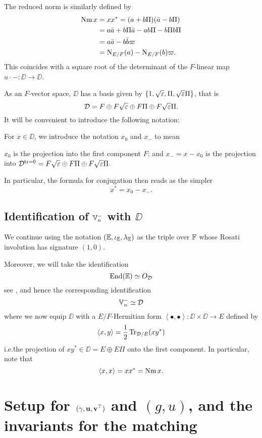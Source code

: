 The reduced norm is similarly defined by
\begin{align*}
  \operatorname{Nm} x &= x x^\ast = (a + b \Pi)(\bar a - b \Pi) \\
  &= a \bar a + b \Pi \bar a - a b \Pi - b \Pi b \Pi \\
  &= a \bar a - b \bar b \varpi \\
  &= \operatorname{N}_{E/F}(a) - \operatorname{N}_{E/F}(b) \varpi .
\end{align*}
This coincides with a square root of
the determinant of the $F$-linear map $u \cdot - \colon \DD \to \DD$.

As an $F$-vector space, $\DD$ has a basis given by
$\{1, \sqrt{\varepsilon}, \Pi, \sqrt{\varepsilon}\Pi\}$, that is
\[ \mathcal D = F \oplus F\sqrt{\varepsilon} \oplus F \Pi \oplus F\sqrt{\varepsilon}\Pi. \]
It will be convenient to introduce the following notation:
\begin{definition}
  For $x \in \DD$, we introduce the notation $x_0$ and $x_-$ to mean
  \begin{itemize}
    \ii $x_0$ is the projection into the first component $F$; and
    \ii $x_- = x - x_0$ is the projection into
    $\mathcal D^{\operatorname{tr} = 0} = F\sqrt{\varepsilon} \oplus F \Pi \oplus F\sqrt{\varepsilon}\Pi$.
  \end{itemize}
\end{definition}
In particular, the formula for conjugation then reads as the simpler
\[ x^\ast = x_0 - x_-. \]

\subsection{Identification of $\mathbb V_n^-$ with $\DD$}
We continue using the notation $(\mathbb E, \iota_\mathbb E, \lambda_\mathbb E)$ as the triple over $\mathbb F$
whose Rosati involution has signature $(1,0)$.

Moreover, we will take the identification
\[ \operatorname{End}(\mathbb E) \simeq O_\mathcal D \]
see \cite[Remark 2.5]{ref:KR},
and hence the corresponding identification
\[ \mathbb V_n^- \simeq \mathcal D \]
where we  now equip $\DD$ with a $E/F$-Hermitian form
$\left\langle \bullet, \bullet \right\rangle \colon \DD \times \DD \to E$
defined by
\[ \left\langle x,y \right\rangle = \frac{1}{2} \operatorname{Tr}_{\mathcal D/E}(xy^\ast) \]
i.e.\. the projection of $xy^\ast \in \DD = E \oplus E\Pi$ onto the first component.
In particular, note that
\[ \left\langle x,x \right\rangle  = x x^\ast = \operatorname{Nm} x. \]

\section{Setup for ${(\gamma, \mathbf u, \mathbf v^\top)}$ and $(g,u)$, and the invariants for the matching}
